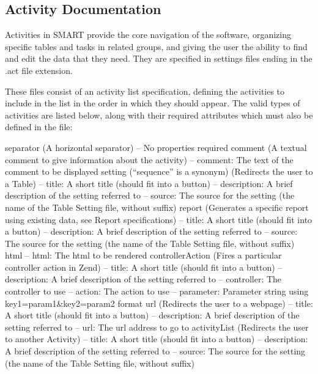 \documentclass[12pt]{article}
\begin{document}
\begin{appendices}
\clearpage
\section{Activity Documentation}
Activities in SMART provide the core navigation of the software, organizing specific tables and tasks in related groups, and giving the user the ability to find and edit the data that they need. They are specified in settings files ending in the .act file extension.

These files consist of an activity list specification, defining the activities to include in the list in the order in which they should appear. The valid types of activities are listed below, along with their required attributes which must also be defined in the file:

\begin{framed}
separator (A horizontal separator)
    -- No properties required
comment (A textual comment to give information about the activity)
    -- comment: The text of the comment to be displayed
setting (“sequence” is a synonym) (Redirects the user to a Table)
    -- title: A short title (should fit into a button)
    -- description: A brief description of the setting referred to
    -- source: The source for the setting (the name of the Table Setting file, without suffix)
report (Generates a specific report using existing data, see Report specifications)
    -- title: A short title (should fit into a button)
    -- description: A brief description of the setting referred to
    -- source: The source for the setting (the name of the Table Setting file, without suffix)
html
    -- html: The html to be rendered
controllerAction (Fires a particular controller action in Zend)
    -- title: A short title (should fit into a button)
    -- description: A brief description of the setting referred to
    -- controller: The controller to use
    -- action: The action to use
    -- parameter: Parameter string using key1=param1\&key2=param2 format
url (Redirects the user to a webpage)
    -- title: A short title (should fit into a button)
    -- description: A brief description of the setting referred to
    -- url: The url address to go to
activityList (Redirects the user to another Activity)
    -- title: A short title (should fit into a button)
    -- description: A brief description of the setting referred to
    -- source: The source for the setting (the name of the Table Setting file, without suffix)
\end{framed}


\end{appendices}
\end{document}
